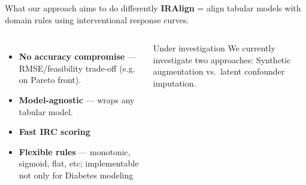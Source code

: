 \documentclass[aspectratio=169,11pt]{beamer}
\begin{document}
\begin{frame}{What our approach aims to do differently}
  \small
  \textbf{IRAlign} =  align tabular models with domain rules using interventional response curves.
  \begin{columns}[T]
    \begin{itemize}
      \item \textbf{No accuracy compromise} --- RMSE/feasibility trade-off (e.g. on Pareto front).
      \item \textbf{Model-agnostic} --- wraps any tabular model.
      \item \textbf{Fast IRC scoring} 
      \item \textbf{Flexible rules} --- monotonic, sigmoid, flat, etc; implementable not only for Diabetes modeling
    \end{itemize}
    \begin{block}{Under investigation}
      We currently investigate two approaches: Synthetic augmentation vs.\ latent confounder imputation.
    \end{block}
  \end{columns}
\end{frame}
\end{document}
